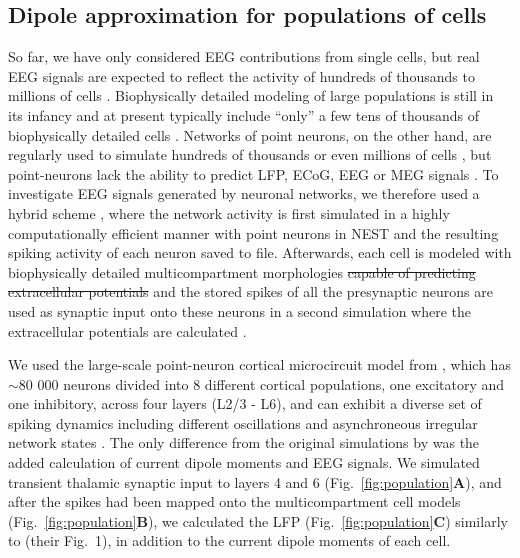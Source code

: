 \documentclass[preprint,10pt,authoryear]{elsarticle}
\newcommand{\gex}[1]{{\color{Orange}#1}}
\begin{document}
\subsection{Dipole approximation for populations of cells}\label{subsec:populations}
So far, we have only considered EEG contributions from single cells, but real EEG signals are expected to reflect the activity of hundreds of thousands to millions of cells \citep{NUNEZ2006, COHEN2017}. 
Biophysically detailed modeling of large populations is still in its infancy \citep{EINEVOLL2019} and at present typically include ``only'' a few tens of thousands of biophysically detailed cells \citep{MARKRAM2015, BILLEH2019}. Networks of point neurons, on the other hand, are regularly used to simulate hundreds of thousands \citep{BILLEH2019} or even millions of cells \citep{SENK2018, SCHMIDT2018}, but point-neurons lack the ability to predict LFP, ECoG, EEG or MEG signals \citep{EINEVOLL2013REVIEW}.  
\gex{To investigate EEG signals generated by neuronal networks, we therefore used a hybrid} scheme \citep{HAGEN2016, SENK2018, Skaar2020}, where the network activity is first simulated in a highly computationally efficient manner with point neurons in NEST \citep{NEST} and the \gex{resulting} spiking activity of each neuron saved to file. Afterwards, each cell is modeled with biophysically detailed multicompartment morphologies \gex{\sout{capable of predicting extracellular potentials}} and the \gex{stored} spikes of all the presynaptic neurons are used as synaptic input \gex{onto these neurons in a second simulation  where the extracellular potentials are calculated} \citep{HAGEN2016, SENK2018}.

We used the large-scale point-neuron cortical microcircuit model from \cite{POTJANS2014, HAGEN2016}, which has $\sim$80 000 neurons divided into 8 different cortical populations, one excitatory and one inhibitory\gex{,} across four layers (L2/3 - L6), and can exhibit a diverse set of spiking dynamics including different oscillations and asynchroneous irregular network states \citep{HAGEN2016, BRUNEL2000}. 
The only difference from the original simulations by \cite{HAGEN2016} was the added calculation of current dipole moments \gex{and EEG signals}.
We simulated transient thalamic synaptic input to layers 4 and 6 (Fig.~\ref{fig:population}\textbf{A}), and after the spikes had been mapped onto the multicompartment cell models (Fig.~\ref{fig:population}\textbf{B}), we calculated the LFP (Fig.~\ref{fig:population}\textbf{C}) similarly to \cite{HAGEN2016} (their Fig.~1), in addition to the current dipole moments of each cell.
\end{document}
